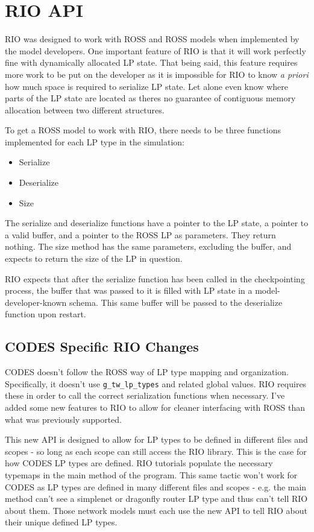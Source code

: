 \documentclass[letterpaper, 11 pt, conference]{IEEEtran}
\begin{document}
\section{RIO API}
RIO was designed to work with ROSS and ROSS models when implemented by the model developers. One important feature of RIO is that it will work perfectly fine with dynamically allocated LP state. That being said, this feature requires more work to be put on the developer as it is impossible for RIO to know \emph{a priori} how much space is required to serialize LP state. Let alone even know where parts of the LP state are located as theres no guarantee of contiguous memory allocation between two different structures.

To get a ROSS model to work with RIO, there needs to be three functions implemented for each LP type in the simulation: 

\begin{itemize}
	\item Serialize
	\item Deserialize
	\item Size
\end{itemize}

The serialize and deserialize functions have a pointer to the LP state, a pointer to a valid buffer, and a pointer to the ROSS LP as parameters. They return nothing. The size method has the same parameters, excluding the buffer, and expects to return the size of the LP in question.

RIO expects that after the serialize function has been called in the checkpointing process, the buffer that was passed to it is filled with LP state in a model-developer-known schema. This same buffer will be passed to the deserialize function upon restart.

\subsection{CODES Specific RIO Changes}
CODES doesn't follow the ROSS way of LP type mapping and organization. Specifically, it doesn't use \texttt{g\_tw\_lp\_types} and related global values. RIO requires these in order to call the correct serialization functions when necessary. I've added some new features to RIO to allow for cleaner interfacing with ROSS than what was previously supported. 

This new API is designed to allow for LP types to be defined in different files and scopes - so long as each scope can still access the RIO library. This is the case for how CODES LP types are defined. RIO tutorials populate the necessary typemaps in the main method of the program. This same tactic won't work for CODES as LP types are defined in many different files and scopes - e.g. the main method can't see a simplenet or dragonfly router LP type and thus can't tell RIO about them. Those network models must each use the new API to tell RIO about their unique defined LP types.
\end{document}

